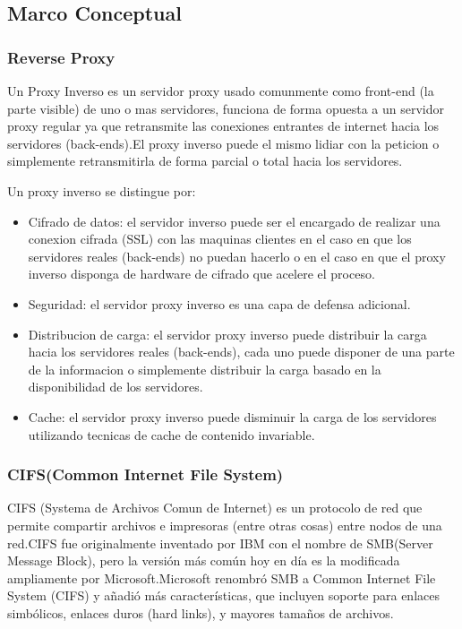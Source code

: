 \subsection{Marco Conceptual}

\subsubsection*{Reverse Proxy}

Un Proxy Inverso es un servidor proxy usado comunmente como front-end (la parte visible) de uno o mas servidores, funciona de forma opuesta a un servidor proxy regular ya que retransmite las conexiones entrantes de internet hacia los servidores (back-ends).\newline El proxy inverso puede el mismo lidiar con la peticion o simplemente retransmitirla de forma parcial o total hacia los servidores.

Un proxy inverso se distingue por:

\begin{itemize}

	\item Cifrado de datos: el servidor inverso puede ser el encargado de realizar una conexion cifrada (SSL) con las maquinas clientes en el caso en que los servidores reales (back-ends) no puedan hacerlo o en el caso en que el proxy inverso disponga de hardware de cifrado que acelere el proceso.
	
	\item Seguridad: el servidor proxy inverso es una capa de defensa adicional.
	
	\item Distribucion de carga: el servidor proxy inverso puede distribuir la carga	hacia los servidores reales (back-ends), cada uno puede disponer de una parte de la informacion o simplemente distribuir la carga basado en la disponibilidad de los servidores.
	
	\item Cache: el servidor proxy inverso puede disminuir la carga de los servidores utilizando tecnicas de cache de contenido invariable.

\end{itemize}


\subsubsection*{CIFS(Common Internet File System)}

CIFS (Systema de Archivos Comun de Internet) es un protocolo de red que permite compartir archivos e impresoras (entre otras cosas) entre nodos de una red.\newline CIFS fue originalmente inventado por IBM con el nombre de SMB(Server Message Block), pero la versión más común hoy en día es la modificada ampliamente por Microsoft.\newline  Microsoft renombró SMB a Common Internet File System (CIFS) y añadió más características, que incluyen soporte para enlaces simbólicos, enlaces duros (hard links), y mayores tamaños de archivos.


